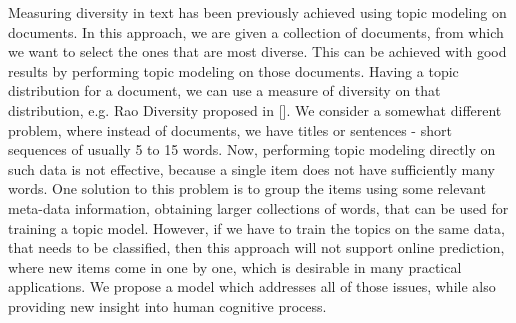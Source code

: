 Measuring diversity in text has been previously achieved using topic
modeling on documents. In this approach, we are given a collection of
documents, from which we want to select the ones that are most
diverse. This can be achieved with good results by performing topic
modeling on those documents. Having a topic distribution for a
document, we can use a measure of diversity on that distribution,
e.g. Rao Diversity proposed in []. We consider a somewhat different
problem, where instead of documents, we have titles or sentences -
short sequences of usually 5 to 15 words. Now, performing topic
modeling directly on such data is not effective, because a single item
does not have sufficiently many words. One solution to this problem is
to group the items using some relevant meta-data information,
obtaining larger collections of words, that can be used for training a
topic model. However, if we have to train the topics on the same data,
that needs to be classified, then this approach will not support
online prediction, where new items come in one by one, which is
desirable in many practical applications. We propose a model which
addresses all of those issues, while also providing new insight into
human cognitive process.